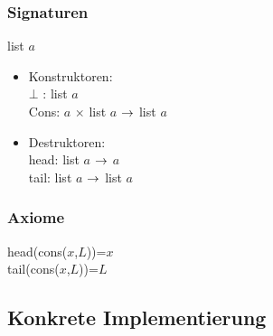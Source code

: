 \documentclass[a4paper,twoside,DIV15,BCOR12mm]{scrbook}
\begin{document}
\subsubsection*{Signaturen}
list $a$\\
\begin{itemize}
	\item Konstruktoren:\\
$\bot$ : list $a$\\
Cons: $a$ $\times$ list $a$ $\rightarrow$ list $a$\\
	\item Destruktoren:\\
head: list $a$ $\rightarrow$ $a$\\
tail: list $a$ $\rightarrow$ list $a$\\
\end{itemize}

\subsubsection*{Axiome}
head(cons($x$,$L$))=$x$\\
tail(cons($x$,$L$))=$L$\\



\subsection{Konkrete Implementierung}
\end{document}
